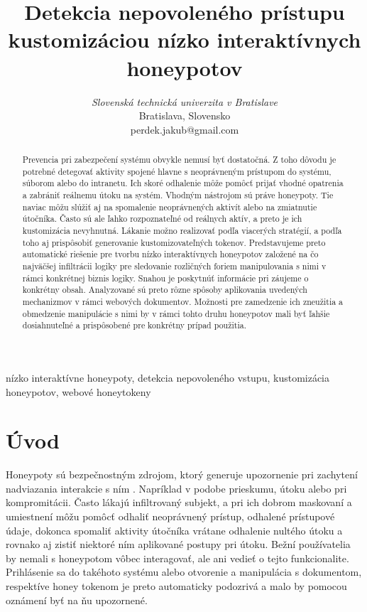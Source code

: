 \documentclass[conference, 11pt,slovak,a4paper,twoside]{IEEEtran}
\begin{document}
\title{Detekcia nepovoleného prístupu kustomizáciou nízko interaktívnych honeypotov}

\author{
\textit{Slovenská technická univerzita v Bratislave}\\
Bratislava, Slovensko \\
perdek.jakub@gmail.com}

\maketitle

\begin{abstract}
Prevencia pri zabezpečení systému obvykle nemusí byť dostatočná. Z toho dôvodu je potrebné detegovať aktivity spojené hlavne s neoprávneným prístupom do systému, súborom alebo do intranetu. Ich skoré odhalenie môže pomôcť prijať vhodné opatrenia a zabrániť reálnemu útoku na systém. Vhodným nástrojom sú práve honeypoty. Tie naviac môžu slúžiť aj na spomalenie neoprávnených aktivít alebo na zmiatnutie útočníka. Často sú ale ľahko rozpoznateľné od reálnych aktív, a preto je ich kustomizácia nevyhnutná. Lákanie možno realizovať podľa viacerých stratégií, a podľa toho aj prispôsobiť generovanie kustomizovateľných tokenov. Predstavujeme preto automatické riešenie pre tvorbu nízko interaktívnych honeypotov založené na čo najväčšej infiltrácii logiky pre sledovanie rozličných foriem manipulovania s nimi v rámci konkrétnej biznis logiky. Snahou je poskytnúť informácie pri záujeme o konkrétny obsah. Analyzované sú preto rôzne spôsoby aplikovania uvedených mechanizmov v rámci webových dokumentov. Možnosti pre zamedzenie ich zneužitia a obmedzenie manipulácie s nimi by v rámci tohto druhu honeypotov mali byť ľahšie dosiahnuteľné a prispôsobené pre konkrétny prípad použitia.   
\end{abstract}

\begin{IEEEkeywords}
nízko interaktívne honeypoty, detekcia nepovoleného vstupu, kustomizácia honeypotov, webové honeytokeny
\end{IEEEkeywords}

\section{Úvod}
Honeypoty sú bezpečnostným zdrojom, ktorý generuje upozornenie pri zachytení nadviazania interakcie s ním \cite{sanders_intrusion_2020}. Napríklad v podobe prieskumu, útoku alebo pri kompromitácii. Často lákajú infiltrovaný subjekt, a pri ich dobrom maskovaní a umiestnení môžu pomôcť odhaliť neoprávnený prístup, odhalené prístupové údaje, dokonca spomaliť aktivity útočníka vrátane odhalenie nultého útoku a rovnako aj zistiť niektoré ním aplikované postupy pri útoku. Bežní používatelia by nemali s honeypotom vôbec interagovať, ale ani vedieť  o tejto funkcionalite. Prihlásenie sa do takéhoto systému alebo otvorenie a manipulácia s dokumentom, respektíve honey tokenom \cite{ng_honeypot_2018} je preto automaticky podozrivá a malo by pomocou oznámení byť na ňu upozornené.
\end{document}

